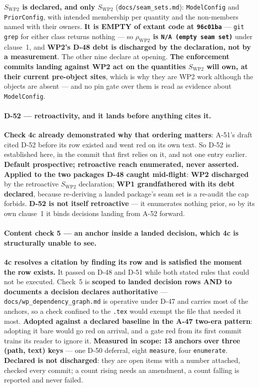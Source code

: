 \documentclass[
  10pt,
]{article}
\begin{document}
\textbf{$S_{\mathrm{WP2}}$ is declared, and only $S_{\mathrm{WP2}}$} (\texttt{docs/\allowbreak{}seam\_sets.md}): \texttt{ModelConfig} and \texttt{PriorConfig}, with intended membership per quantity and the non-members named with their owners. \textbf{It is EMPTY of extant code at \texttt{96c01ba}} --- \texttt{git grep} for either class returns nothing --- so \textbf{$\rho_{\mathrm{WP2}}$ is \texttt{N/A (empty seam set)}} under clause~1, and \textbf{WP2's D-48 debt is discharged by the declaration, not by a measurement}. The other nine declare at opening. \textbf{The enforcement commits landing against WP2 act on the quantities $S_{\mathrm{WP2}}$ will own, at their current pre-object sites}, which is why they are WP2 work although the objects are absent --- and no pin gate over them is read as evidence about \texttt{ModelConfig}.

\paragraph{D-52 --- retroactivity, and it lands before anything cites it.}
\textbf{Check 4c already demonstrated why that ordering matters}: A-51's draft cited D-52 before its row existed and went red on its own text. So D-52 is established here, in the commit that first relies on it, and not one entry earlier. \textbf{Default prospective; retroactive reach enumerated, never asserted.} \textbf{Applied to the two packages D-48 caught mid-flight}: \textbf{WP2 discharged} by the retroactive $S_{\mathrm{WP2}}$ declaration; \textbf{WP1 grandfathered with its debt declared}, because re-deriving a landed package's seam set is a re-audit the cap forbids. \textbf{D-52 is not itself retroactive} --- it enumerates nothing prior, so by its own clause~1 it binds decisions landing from A-52 forward.

\paragraph{Content check 5 --- an anchor inside a landed decision, which 4c is structurally unable to see.}
\textbf{4c resolves a citation by finding its row and is satisfied the moment the row exists.} It passed on D-48 and D-51 while both stated rules that could not be executed. Check~5 is \textbf{scoped to landed decision rows AND to documents a decision declares authoritative} --- \texttt{docs/\allowbreak{}wp\_dependency\_graph.md} is operative under D-47 and carries most of the anchors, so a check confined to the \texttt{.tex} would exempt the file that needed it most. \textbf{Adopted against a declared baseline in the A-47 two-era pattern}: adopting it bare would go red on arrival, and a gate red from its first commit trains its reader to ignore it. \textbf{Measured in scope: 13 anchors over three (path, text) keys} --- one D-50 deferral, eight \texttt{measure}, four \texttt{enumerate}. \textbf{Declared is not discharged}: they are open items with a number attached, checked every commit; a count rising needs an amendment, a count falling is reported and never failed.
\end{document}
